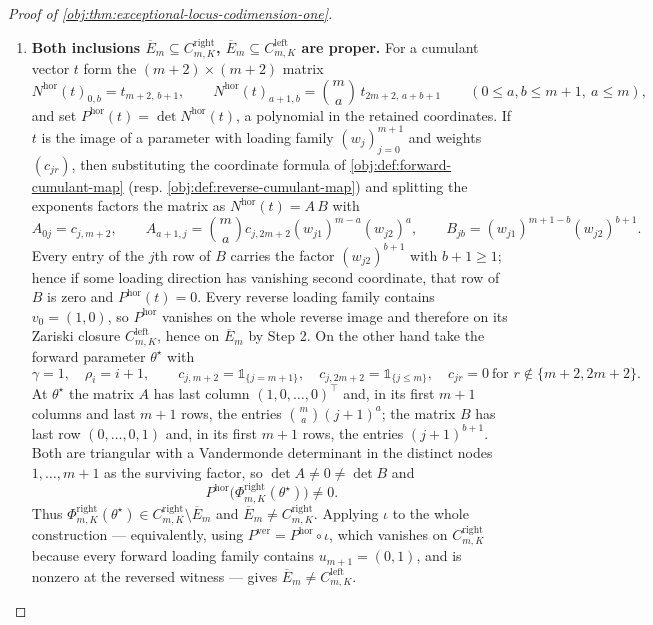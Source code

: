 \begin{proof}[Proof of \cref{obj:thm:exceptional-locus-codimension-one}]
\begin{enumerate}

\item \textbf{Both inclusions \(\overline E_m\subseteq C^{\mathrm{right}}_{m,K}\), \(\overline E_m\subseteq C^{\mathrm{left}}_{m,K}\) are proper.}  For a cumulant vector \(t\) form the \((m+2)\times(m+2)\) matrix
\[
N^{\mathrm{hor}}(t)_{0,b}=t_{m+2,\,b+1},
\qquad
N^{\mathrm{hor}}(t)_{a+1,b}=\binom{m}{a}\,t_{2m+2,\,a+b+1}
\qquad (0\le a,b\le m+1,\ a\le m),
\]
and set \(P^{\mathrm{hor}}(t)=\det N^{\mathrm{hor}}(t)\), a polynomial in the retained coordinates.  If \(t\) is the image of a parameter with loading family \((w_j)_{j=0}^{m+1}\) and weights \((c_{jr})\), then substituting the coordinate formula of \cref{obj:def:forward-cumulant-map} (resp. \cref{obj:def:reverse-cumulant-map}) and splitting the exponents factors the matrix as \(N^{\mathrm{hor}}(t)=A\,B\) with
\[
A_{0j}=c_{j,m+2},
\qquad
A_{a+1,j}=\binom{m}{a}c_{j,2m+2}(w_{j1})^{m-a}(w_{j2})^{a},
\qquad
B_{jb}=(w_{j1})^{m+1-b}(w_{j2})^{b+1}.
\]
Every entry of the \(j\)th row of \(B\) carries the factor \((w_{j2})^{b+1}\) with \(b+1\ge1\); hence if some loading direction has vanishing second coordinate, that row of \(B\) is zero and \(P^{\mathrm{hor}}(t)=0\).  Every reverse loading family contains \(v_0=(1,0)\), so \(P^{\mathrm{hor}}\) vanishes on the whole reverse image and therefore on its Zariski closure \(C^{\mathrm{left}}_{m,K}\), hence on \(\overline E_m\) by Step 2.  On the other hand take the forward parameter \(\theta^{\star}\) with
\[
\gamma=1,\quad \rho_i=i+1,\qquad
c_{j,m+2}=\mathbb 1_{\{j=m+1\}},\quad
c_{j,2m+2}=\mathbb 1_{\{j\le m\}},\quad
c_{jr}=0\ \text{for }r\notin\{m+2,2m+2\}.
\]
At \(\theta^\star\) the matrix \(A\) has last column \((1,0,\ldots,0)^{\top}\) and, in its first \(m+1\) columns and last \(m+1\) rows, the entries \(\binom{m}{a}(j+1)^{a}\); the matrix \(B\) has last row \((0,\ldots,0,1)\) and, in its first \(m+1\) rows, the entries \((j+1)^{b+1}\).  Both are triangular with a Vandermonde determinant in the distinct nodes \(1,\ldots,m+1\) as the surviving factor, so \(\det A\ne0\ne\det B\) and
\[
P^{\mathrm{hor}}\bigl(\Phi^{\mathrm{right}}_{m,K}(\theta^\star)\bigr)\ne0 .
\]
Thus \(\Phi^{\mathrm{right}}_{m,K}(\theta^\star)\in C^{\mathrm{right}}_{m,K}\setminus\overline E_m\) and \(\overline E_m\ne C^{\mathrm{right}}_{m,K}\).  Applying \(\iota\) to the whole construction — equivalently, using \(P^{\mathrm{ver}}=P^{\mathrm{hor}}\circ\iota\), which vanishes on \(C^{\mathrm{right}}_{m,K}\) because every forward loading family contains \(u_{m+1}=(0,1)\), and is nonzero at the reversed witness — gives \(\overline E_m\ne C^{\mathrm{left}}_{m,K}\).

\end{enumerate}
\end{proof}
